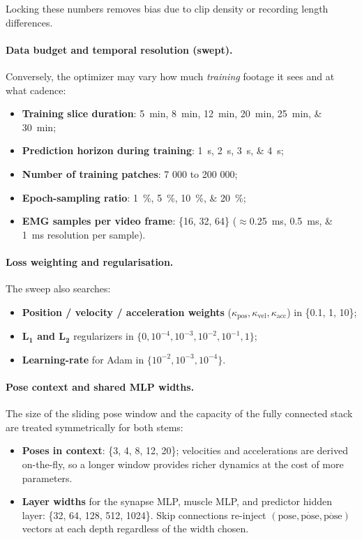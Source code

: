 Locking these numbers removes bias due to clip density or recording length
differences.

\paragraph{Data budget and temporal resolution (swept).}
Conversely, the optimizer may vary how much \emph{training} footage it sees and
at what cadence:

\begin{itemize}
  \item \textbf{Training slice duration}: \SIlist{5;8;12;20;25;30}{min};
  \item \textbf{Prediction horizon during training}: \SIlist{1;2;3;4}{s};
  \item \textbf{Number of training patches}: 7 000 to 200 000;
  \item \textbf{Epoch-sampling ratio}: \SIlist{1;5;10;20}{\%};
  \item \textbf{EMG samples per video frame}: \{16, 32, 64\}
        (\(\approx\)\SIlist{0.25;0.5;1}{ms} resolution per sample).
\end{itemize}

\paragraph{Loss weighting and regularisation.}
The sweep also searches:

\begin{itemize}
  \item \textbf{Position / velocity / acceleration weights}
        (\(\kappa_{\text{pos}},\kappa_{\text{vel}},\kappa_{\text{acc}}\))
        in \{0.1, 1, 10\};
  \item \textbf{L\(_\mathbf{1}\) and L\(_\mathbf{2}\)} regularizers in
        \(\{0,10^{-4},10^{-3},10^{-2},10^{-1},1\}\);
  \item \textbf{Learning-rate} for Adam in \(\{10^{-2},10^{-3},10^{-4}\}\).
\end{itemize}

\paragraph{Pose context and shared MLP widths.}
The size of the sliding pose window and the capacity of the fully connected
stack are treated symmetrically for both stems:

\begin{itemize}
  \item \textbf{Poses in context}: \{3, 4, 8, 12, 20\};
        velocities and accelerations are derived on-the-fly, so a longer
        window provides richer dynamics at the cost of more parameters.
  \item \textbf{Layer widths} for the synapse MLP, muscle MLP, and predictor
        hidden layer: \{32, 64, 128, 512, 1024\}.
        Skip connections re-inject \((\text{pose},\dot{\text{pose}},
        \ddot{\text{pose}})\) vectors at each depth regardless of the width
        chosen.
\end{itemize}

